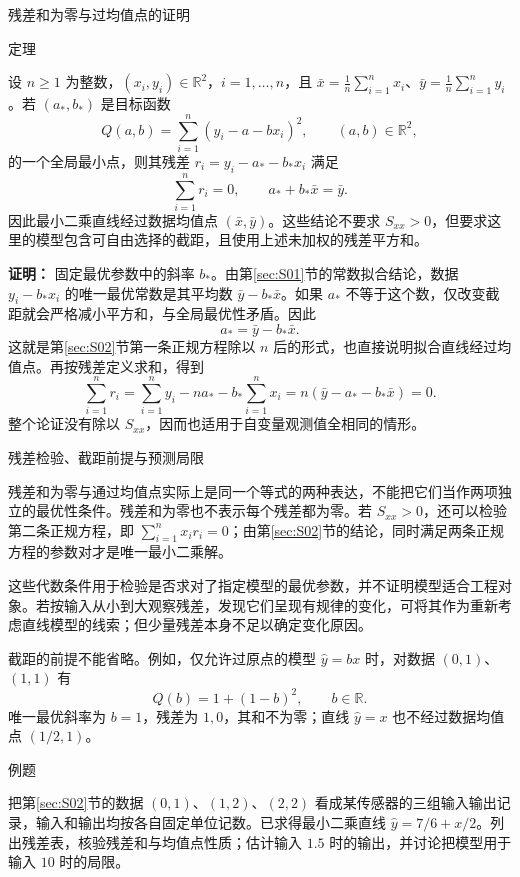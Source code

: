 \documentclass[aspectratio=169,10pt,fontset=fandol]{ctexbeamer}
\begin{document}
\begin{frame}[t,fragile]{残差和为零与过均值点的证明}
\small
\begin{block}{定理}
{\small
设 $n\geq1$ 为整数，$(x_i,y_i)\in\mathbb{R}^2$，$i=1,\ldots,n$，且 $\bar{x}=\frac1n\sum_{i=1}^{n}x_i$、$\bar{y}=\frac1n\sum_{i=1}^{n}y_i$。若 $(a_*,b_*)$ 是目标函数
\[
Q(a,b)=\sum_{i=1}^{n}(y_i-a-bx_i)^2,\qquad (a,b)\in\mathbb{R}^2,
\]
的一个全局最小点，则其残差 $r_i=y_i-a_*-b_*x_i$ 满足
\[
\sum_{i=1}^{n}r_i=0,\qquad a_*+b_*\bar{x}=\bar{y}.
\]
因此最小二乘直线经过数据均值点 $(\bar{x},\bar{y})$。这些结论不要求 $S_{xx}>0$，但要求这里的模型包含可自由选择的截距，且使用上述未加权的残差平方和。

}
\end{block}
\pause
{\small
\textbf{证明：}
固定最优参数中的斜率 $b_*$。由第\ref{sec:S01}节的常数拟合结论，数据 $y_i-b_*x_i$ 的唯一最优常数是其平均数 $\bar{y}-b_*\bar{x}$。如果 $a_*$ 不等于这个数，仅改变截距就会严格减小平方和，与全局最优性矛盾。因此
\[
a_* =\bar{y}-b_*\bar{x}.
\]
这就是第\ref{sec:S02}节第一条正规方程除以 $n$ 后的形式，也直接说明拟合直线经过均值点。再按残差定义求和，得到
\[
\sum_{i=1}^{n}r_i
=\sum_{i=1}^{n}y_i-na_*-b_*\sum_{i=1}^{n}x_i
=n(\bar{y}-a_*-b_*\bar{x})=0.
\]
整个论证没有除以 $S_{xx}$，因而也适用于自变量观测值全相同的情形。

}
\end{frame}
\begin{frame}[t,fragile]{残差检验、截距前提与预测局限}
\normalsize
{\normalsize
残差和为零与通过均值点实际上是同一个等式的两种表达，不能把它们当作两项独立的最优性条件。残差和为零也不表示每个残差都为零。若 $S_{xx}>0$，还可以检验第二条正规方程，即 $\sum_{i=1}^{n}x_i r_i=0$；由第\ref{sec:S02}节的结论，同时满足两条正规方程的参数对才是唯一最小二乘解。


}
{\normalsize
这些代数条件用于检验是否求对了指定模型的最优参数，并不证明模型适合工程对象。若按输入从小到大观察残差，发现它们呈现有规律的变化，可将其作为重新考虑直线模型的线索；但少量残差本身不足以确定变化原因。


}
{\normalsize
截距的前提不能省略。例如，仅允许过原点的模型 $\hat{y}=bx$ 时，对数据 $(0,1)$、$(1,1)$ 有
\[
Q(b)=1+(1-b)^2,\qquad b\in\mathbb{R}.
\]
唯一最优斜率为 $b=1$，残差为 $1,0$，其和不为零；直线 $\hat{y}=x$ 也不经过数据均值点 $(1/2,1)$。\par

}
\begin{block}{例题}
{\normalsize
把第\ref{sec:S02}节的数据 $(0,1)$、$(1,2)$、$(2,2)$ 看成某传感器的三组输入输出记录，输入和输出均按各自固定单位记数。已求得最小二乘直线 $\hat{y}=7/6+x/2$。列出残差表，核验残差和与均值点性质；估计输入 $1.5$ 时的输出，并讨论把模型用于输入 $10$ 时的局限。

}
\end{block}
\end{frame}
\end{document}
